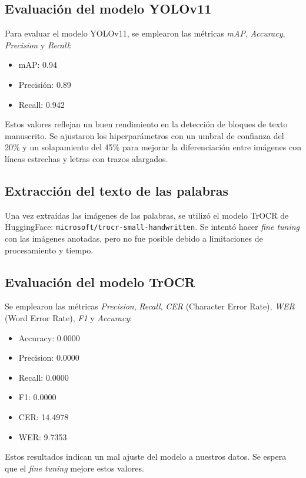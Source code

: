 \documentclass[11pt,a4paper]{article}
\begin{document}
\subsection{Evaluación del modelo YOLOv11}
Para evaluar el modelo YOLOv11, se emplearon las métricas \textit{mAP}, \textit{Accuracy}, \textit{Precision} y \textit{Recall}:

\begin{itemize}
    \item mAP: 0.94
    \item Precisión: 0.89
    \item Recall: 0.942
\end{itemize}

Estos valores reflejan un buen rendimiento en la detección de bloques de texto manuscrito. Se ajustaron los hiperparámetros con un umbral de confianza del 20\% y un solapamiento del 45\% para mejorar la diferenciación entre imágenes con líneas estrechas y letras con trazos alargados.

\subsection{Extracción del texto de las palabras}
Una vez extraídas las imágenes de las palabras, se utilizó el modelo TrOCR de HuggingFace: \texttt{microsoft/trocr-small-handwritten}. Se intentó hacer \textit{fine tuning} con las imágenes anotadas, pero no fue posible debido a limitaciones de procesamiento y tiempo.

\subsection{Evaluación del modelo TrOCR}
Se emplearon las métricas \textit{Precision}, \textit{Recall}, \textit{CER} (Character Error Rate), \textit{WER} (Word Error Rate), \textit{F1} y \textit{Accuracy}:

\begin{itemize}
    \item Accuracy: 0.0000
    \item Precision: 0.0000
    \item Recall: 0.0000
    \item F1: 0.0000
    \item CER: 14.4978
    \item WER: 9.7353
\end{itemize}

Estos resultados indican un mal ajuste del modelo a nuestros datos. Se espera que el \textit{fine tuning} mejore estos valores.
\end{document}

